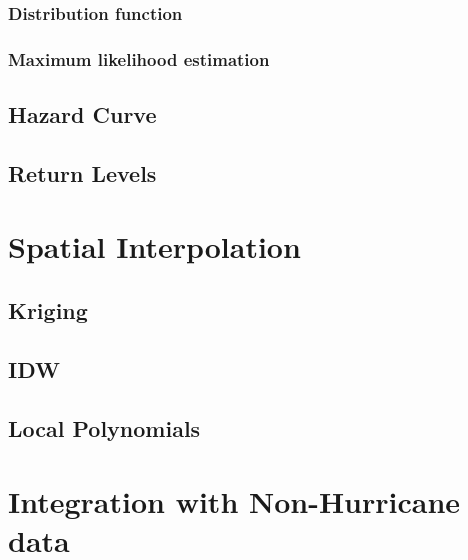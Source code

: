 \documentclass[12pt,oneside]{reedthesis}
\begin{document}
\hypertarget{distribution-function}{%
\subsubsection{Distribution function}\label{distribution-function}}

\hypertarget{maximum-likelihood-estimation}{%
\subsubsection{Maximum likelihood estimation}\label{maximum-likelihood-estimation}}

\hypertarget{hazard-curve}{%
\subsection{Hazard Curve}\label{hazard-curve}}

\hypertarget{return-levels}{%
\subsection{Return Levels}\label{return-levels}}

\hypertarget{spatial-interpolation}{%
\section{Spatial Interpolation}\label{spatial-interpolation}}

\hypertarget{kriging}{%
\subsection{Kriging}\label{kriging}}

\hypertarget{idw}{%
\subsection{IDW}\label{idw}}

\hypertarget{local-polynomials}{%
\subsection{Local Polynomials}\label{local-polynomials}}

\hypertarget{integration-with-non-hurricane-data}{%
\section{Integration with Non-Hurricane data}\label{integration-with-non-hurricane-data}}
\end{document}
